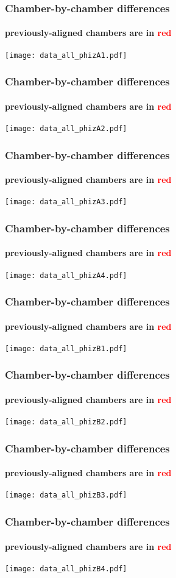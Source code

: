 \documentclass[compress]{beamer}
\begin{document}
\begin{frame}
\frametitle{Chamber-by-chamber differences}
\framesubtitle{previously-aligned chambers are in \textcolor{red}{red}}
\texttt{[image: data\_all\_phizA1.pdf]}
\end{frame}

\begin{frame}
\frametitle{Chamber-by-chamber differences}
\framesubtitle{previously-aligned chambers are in \textcolor{red}{red}}
\texttt{[image: data\_all\_phizA2.pdf]}
\end{frame}

\begin{frame}
\frametitle{Chamber-by-chamber differences}
\framesubtitle{previously-aligned chambers are in \textcolor{red}{red}}
\texttt{[image: data\_all\_phizA3.pdf]}
\end{frame}

\begin{frame}
\frametitle{Chamber-by-chamber differences}
\framesubtitle{previously-aligned chambers are in \textcolor{red}{red}}
\texttt{[image: data\_all\_phizA4.pdf]}
\end{frame}

\begin{frame}
\frametitle{Chamber-by-chamber differences}
\framesubtitle{previously-aligned chambers are in \textcolor{red}{red}}
\texttt{[image: data\_all\_phizB1.pdf]}
\end{frame}

\begin{frame}
\frametitle{Chamber-by-chamber differences}
\framesubtitle{previously-aligned chambers are in \textcolor{red}{red}}
\texttt{[image: data\_all\_phizB2.pdf]}
\end{frame}

\begin{frame}
\frametitle{Chamber-by-chamber differences}
\framesubtitle{previously-aligned chambers are in \textcolor{red}{red}}
\texttt{[image: data\_all\_phizB3.pdf]}
\end{frame}

\begin{frame}
\frametitle{Chamber-by-chamber differences}
\framesubtitle{previously-aligned chambers are in \textcolor{red}{red}}
\texttt{[image: data\_all\_phizB4.pdf]}
\end{frame}
\end{document}
